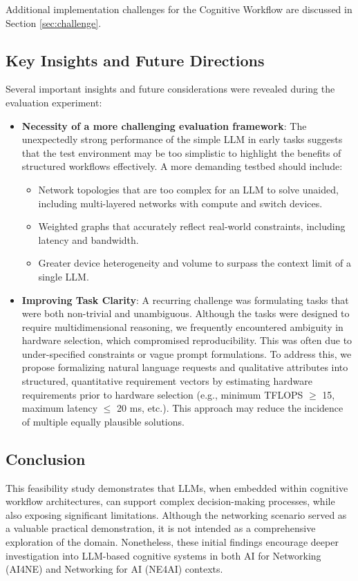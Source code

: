 Additional implementation challenges for the Cognitive Workflow are discussed in Section \ref{sec:challenge}.



\subsection{Key Insights and Future Directions}


Several important insights and future considerations were revealed during the evaluation experiment:

\begin{itemize}[leftmargin=*, label=--]

  \item \textbf{Necessity of a more challenging evaluation framework}: The unexpectedly strong performance of the simple LLM in early tasks suggests that the test environment may be too simplistic to highlight the benefits of structured workflows effectively. A more demanding testbed should include:
    \begin{itemize}[leftmargin=2em, label=--]
      \item Network topologies that are too complex for an LLM to solve unaided, including multi-layered networks with compute and switch devices.
      \item Weighted graphs that accurately reflect real-world constraints, including latency and bandwidth.
      \item Greater device heterogeneity and volume to surpass the context limit of a single LLM.
    \end{itemize}

  \item \textbf{Improving Task Clarity}: A recurring challenge was formulating tasks that were both non-trivial and unambiguous. Although the tasks were designed to require multidimensional reasoning, we frequently encountered ambiguity in hardware selection, which compromised reproducibility. This was often due to under-specified constraints or vague prompt formulations. To address this, we propose formalizing natural language requests and qualitative attributes into structured, quantitative requirement vectors by estimating hardware requirements prior to hardware selection (e.g., minimum TFLOPS $\geq$ 15, maximum latency $\leq$ 20 ms, etc.). This approach may reduce the incidence of multiple equally plausible solutions.

\end{itemize}


\subsection{Conclusion}
This feasibility study demonstrates that LLMs, when embedded within cognitive workflow architectures, can support complex decision-making processes, while also exposing significant limitations. Although the networking scenario served as a valuable practical demonstration, it is not intended as a comprehensive exploration of the domain. Nonetheless, these initial findings encourage deeper investigation into LLM-based cognitive systems in both AI for Networking (AI4NE) and Networking for AI (NE4AI) contexts.

